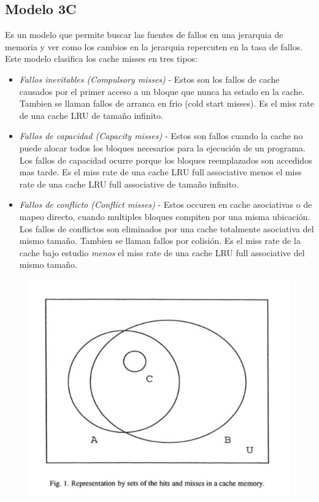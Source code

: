 \documentclass{article}
\begin{document}
\subsection{Modelo 3C}
Es un modelo que permite buscar las fuentes de fallos en una jerarquia de memoria  y ver como los cambios en la jerarquia repercuten en la tasa de fallos.
Este modelo clasifica los cache misses en tres tipos:
\begin{itemize} 
    \item \textit{Fallos inevitables (Compulsory misses)} - Estos son los fallos de cache causados por el primer acceso a un bloque que nunca ha estado en la cache. Tambien se llaman fallos de arranca en frio (cold start misses). Es el miss rate de una cache LRU de tamaño infinito.
    \item \textit{Fallos de capacidad (Capacity misses)} - Estos son fallos cuando la cache no puede alocar todos los bloques necesarios para la ejecución de un programa. Los fallos de capacidad ocurre porque los bloques reemplazados son accedidos mas tarde. Es el miss rate de una cache LRU full associative menos el miss rate de una cache LRU full associative de tamaño infinito.
    \item \textit{Fallos de conflicto (Conflict misses)} - Estos occuren en cache asociativas o de mapeo directo, cuando multiples bloques compiten por una misma ubicación. Los fallos de conflictos son eliminados por una cache totalmente asociativa del mismo tamaño. Tambien se llaman fallos por colisión. Es el miss rate de la cache bajo estudio \textit{menos} el miss rate de una cache LRU full associative del mismo tamaño. 
\end{itemize}

\newpage
\begin{figure}[h!]
    \includegraphics[width=\linewidth]{imagenes/Conjuntos3C.png}
\end{figure}
\end{document}

